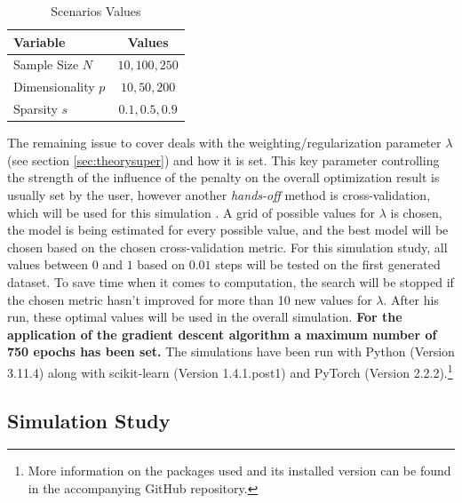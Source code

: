\documentclass[12pt,a4paper]{article}
\begin{document}
\begin{table}[h!]
\begin{center}
\begin{tabular}{lc}\toprule
Variable & Values\\\midrule
Sample Size $N$ & $10, 100, 250$\\
Dimensionality $p$ & $10, 50, 200$\\
Sparsity $s$ & $0.1, 0.5, 0.9$\\\bottomrule
\end{tabular}
\caption{Scenarios Values}
\label{tab:Scenarios}
\end{center}
\end{table}

The remaining issue to cover deals with the weighting/regularization parameter $\lambda$ (see section \ref{sec:theorysuper}) and how it is set. This key parameter controlling the strength of the influence of the penalty on the overall optimization result is usually set by the user, however another \textit{hands-off} method is cross-validation, which will be used for this simulation \parencite[250--251]{ESL2009}. A grid of possible values for $\lambda$ is chosen, the model is being estimated for every possible value, and the best model will be chosen based on the chosen cross-validation metric. For this simulation study, all values between $0$ and $1$ based on $0.01$ steps will be tested on the first generated dataset. To save time when it comes to computation, the search will be stopped if the chosen metric hasn't improved for more than 10 new values for $\lambda$. After his run, these optimal values will be used in the overall simulation. \textbf{For the application of the gradient descent algorithm a maximum number of 750 epochs has been set.} The simulations have been run with Python (Version 3.11.4) along with scikit-learn (Version 1.4.1.post1) and PyTorch (Version 2.2.2).\footnote{More information on the packages used and its installed version can be found in the accompanying GitHub repository.}

\subsection{Simulation Study} 
\end{document}
